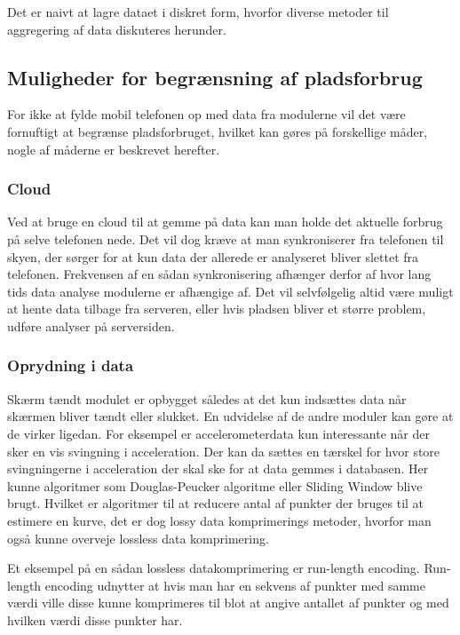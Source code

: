 Det er naivt at lagre dataet i diskret form, hvorfor diverse metoder til aggregering af data diskuteres herunder.

\subsection{Muligheder for begrænsning af pladsforbrug}
For ikke at fylde mobil telefonen op med data fra modulerne vil det være fornuftigt at begrænse pladsforbruget, hvilket kan gøres på forskellige måder, nogle af måderne er beskrevet herefter.

\subsubsection{Cloud}
Ved at bruge en cloud til at gemme på data kan man holde det aktuelle forbrug på selve telefonen nede.
Det vil dog kræve at man synkroniserer fra telefonen til skyen, der sørger for at kun data der allerede er analyseret bliver slettet fra telefonen. 
Frekvensen af en sådan synkronisering afhænger derfor af hvor lang tids data analyse modulerne er afhængige af.
Det vil selvfølgelig altid være muligt at hente data tilbage fra serveren, eller hvis pladsen bliver et større problem, udføre analyser på serversiden.

\subsubsection{Oprydning i data}\label{sec:opryd}
Skærm tændt modulet er opbygget således at det kun indsættes data når skærmen bliver tændt eller slukket.
En udvidelse af de andre moduler kan gøre at de virker ligedan. 
For eksempel er accelerometerdata kun interessante når der sker en vis svingning i acceleration.
Der kan da sættes en tærskel for hvor store svingningerne i acceleration der skal ske for at data gemmes i databasen.
Her kunne algoritmer som Douglas-Peucker algoritme eller Sliding Window blive brugt.
Hvilket er algoritmer til at reducere antal af punkter der bruges til at estimere en kurve, det er dog lossy data komprimerings metoder, hvorfor man også kunne overveje lossless data komprimering.

Et eksempel på en sådan lossless datakomprimering er run-length encoding.
Run-length encoding udnytter at hvis man har en sekvens af punkter med samme værdi ville disse kunne komprimeres til blot at angive antallet af punkter og med hvilken værdi disse punkter har.

